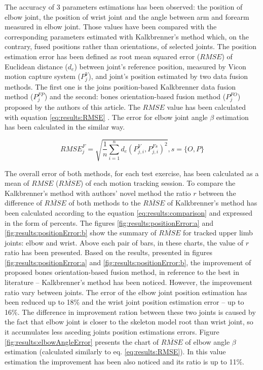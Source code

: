 \documentclass[sensors,article,submit,moreauthors,pdftex,10pt,a4paper]{mdpi}
\begin{document}
	The accuracy of 3 parameters estimations has been observed: the position of elbow joint, the position of wrist joint and the angle between arm and forearm measured in elbow joint. Those values have been compared with the corresponding parameters estimated with Kalkbrenner’s method \cite{Kalkbrenner2014} which, on the contrary, fused positions rather than orientations, of selected joints. The position estimation error has been defined as root mean squared error ($RMSE$) of Euclidean distance ($d_e$) between joint’s reference position, measured by Vicon motion capture system ($P_j^V$), and joint’s position estimated by two data fusion methods. The first one is the joins position-based Kalkbrenner data fusion method ($P_j^{FP}$) and the second: bones orientation-based fusion method ($P_j^{FO}$) proposed by the authors of this article. The $RMSE$ value has been calculated with equation \ref{eq:results:RMSE} \cite{Armstrong1992}. The error for elbow joint angle $\beta$ estimation has been calculated in the similar way.
		
	\begin{equation}
		{RMSE}^F_j = \sqrt{\frac{1}{n}\sum_{i=1}^{n}{d_e(P^V_{j,i}, P^{Fs}_{j,i})^2}} , s = \{O,P\}
		\label{eq:results:RMSE}
	\end{equation}
		
	The overall error of both methods, for each test exercise, has been calculated as a mean of $RMSE$ ($\overline{RMSE}$) of each motion tracking session. To compare the Kalkbrenner’s method with authors’ novel method the ratio $r$ between the difference of $\overline{RMSE}$ of both methods to the $\overline{RMSE}$ of Kalkbrenner’s method has been calculated according to the equation \ref{eq:results:comparison} and expressed in the form of percents. The figures \ref{fig:results:positionError:a} and \ref{fig:results:positionError:b} show the summary of  $\overline{RMSE}$ for tracked upper limb joints: elbow and wrist. Above each pair of bars, in these charts, the value of $r$ ratio has been presented. Based on the results, presented in figures \ref{fig:results:positionError:a} and \ref{fig:results:positionError:b}, the improvement of proposed bones orientation-based fusion method, in reference to the best in literature -- Kalkbrenner’s method has been noticed. However, the improvement ratio vary between joints. The error of the elbow joint position estimation has been reduced up to 18\% and the wrist joint position estimation error -- up to 16\%. The difference in improvement ration between these two joints is caused by the fact that elbow joint is closer to the skeleton model root than wrist joint, so it accumulates less asceding joints position estimations errors. Figure \ref{fig:results:elbowAngleError} presents the chart of $\overline{RMSE}$ of elbow angle $\beta$ estimation (calculated similarly to eq. \ref{eq:results:RMSE}). In this value estimation the improvement has been also noticed and its ratio is up to 11\%.
		
\end{document}
